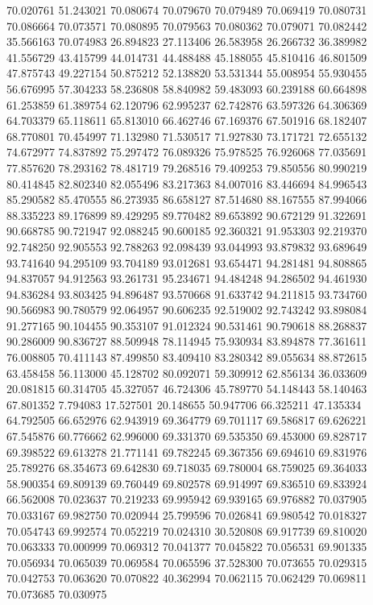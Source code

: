 70.020761
51.243021
70.080674
70.079670
70.079489
70.069419
70.080731
70.086664
70.073571
70.080895
70.079563
70.080362
70.079071
70.082442
35.566163
70.074983
26.894823
27.113406
26.583958
26.266732
36.389982
41.556729
43.415799
44.014731
44.488488
45.188055
45.810416
46.801509
47.875743
49.227154
50.875212
52.138820
53.531344
55.008954
55.930455
56.676995
57.304233
58.236808
58.840982
59.483093
60.239188
60.664898
61.253859
61.389754
62.120796
62.995237
62.742876
63.597326
64.306369
64.703379
65.118611
65.813010
66.462746
67.169376
67.501916
68.182407
68.770801
70.454997
71.132980
71.530517
71.927830
73.171721
72.655132
74.672977
74.837892
75.297472
76.089326
75.978525
76.926068
77.035691
77.857620
78.293162
78.481719
79.268516
79.409253
79.850556
80.990219
80.414845
82.802340
82.055496
83.217363
84.007016
83.446694
84.996543
85.290582
85.470555
86.273935
86.658127
87.514680
88.167555
87.994066
88.335223
89.176899
89.429295
89.770482
89.653892
90.672129
91.322691
90.668785
90.721947
92.088245
90.600185
92.360321
91.953303
92.219370
92.748250
92.905553
92.788263
92.098439
93.044993
93.879832
93.689649
93.741640
94.295109
93.704189
93.012681
93.654471
94.281481
94.808865
94.837057
94.912563
93.261731
95.234671
94.484248
94.286502
94.461930
94.836284
93.803425
94.896487
93.570668
91.633742
94.211815
93.734760
90.566983
90.780579
92.064957
90.606235
92.519002
92.743242
93.898084
91.277165
90.104455
90.353107
91.012324
90.531461
90.790618
88.268837
90.286009
90.836727
88.509948
78.114945
75.930934
83.894878
77.361611
76.008805
70.411143
87.499850
83.409410
83.280342
89.055634
88.872615
63.458458
56.113000
45.128702
80.092071
59.309912
62.856134
36.033609
20.081815
60.314705
45.327057
46.724306
45.789770
54.148443
58.140463
67.801352
7.794083
17.527501
20.148655
50.947706
66.325211
47.135334
64.792505
66.652976
62.943919
69.364779
69.701117
69.586817
69.626221
67.545876
60.776662
62.996000
69.331370
69.535350
69.453000
69.828717
69.398522
69.613278
21.771141
69.782245
69.367356
69.694610
69.831976
25.789276
68.354673
69.642830
69.718035
69.780004
68.759025
69.364033
58.900354
69.809139
69.760449
69.802578
69.914997
69.836510
69.833924
66.562008
70.023637
70.219233
69.995942
69.939165
69.976882
70.037905
70.033167
69.982750
70.020944
25.799596
70.026841
69.980542
70.018327
70.054743
69.992574
70.052219
70.024310
30.520808
69.917739
69.810020
70.063333
70.000999
70.069312
70.041377
70.045822
70.056531
69.901335
70.056934
70.065039
70.069584
70.065596
37.528300
70.073655
70.029315
70.042753
70.063620
70.070822
40.362994
70.062115
70.062429
70.069811
70.073685
70.030975
